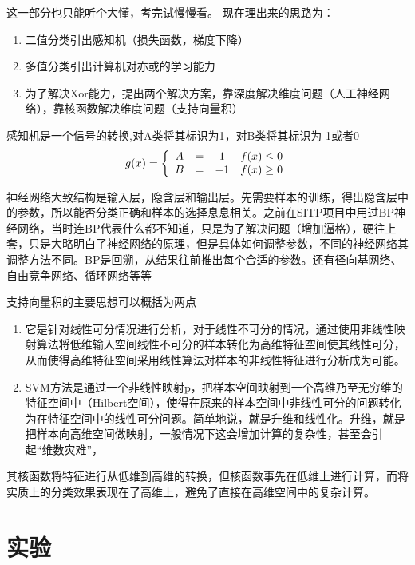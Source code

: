 \documentclass[a4paper,16pt,UTF8]{article}
\begin{document}
这一部分也只能听个大懂，考完试慢慢看。
现在理出来的思路为：

\begin{enumerate}
    \item 二值分类引出感知机（损失函数，梯度下降）
    \item 多值分类引出计算机对亦或的学习能力
    \item 为了解决Xor能力，提出两个解决方案，靠深度解决维度问题（人工神经网络），靠核函数解决维度问题（支持向量积）
\end{enumerate}

感知机是一个信号的转换,对A类将其标识为1，对B类将其标识为-1或者0
\begin{equation*}
    g(x) = \left \{ 
        \begin{array}{c c c c}
            A &=&1 & {f(x) \leq 0}\\
            B &=&-1 & {f(x) \geq 0}
        \end{array} 
        \right.
\end{equation*}

神经网络大致结构是输入层，隐含层和输出层。先需要样本的训练，得出隐含层中的参数，所以能否分类正确和样本的选择息息相关。之前在SITP项目中用过BP神经网络，当时连BP代表什么都不知道，只是为了解决问题（增加逼格），硬往上套，只是大略明白了神经网络的原理，但是具体如何调整参数，不同的神经网络其调整方法不同。BP是回溯，从结果往前推出每个合适的参数。还有径向基网络、自由竞争网络、循环网络等等

支持向量积的主要思想可以概括为两点
\begin{enumerate}
    \item 它是针对线性可分情况进行分析，对于线性不可分的情况，通过使用非线性映射算法将低维输入空间线性不可分的样本转化为高维特征空间使其线性可分，从而使得高维特征空间采用线性算法对样本的非线性特征进行分析成为可能。
    \item SVM方法是通过一个非线性映射p，把样本空间映射到一个高维乃至无穷维的特征空间中（Hilbert空间），使得在原来的样本空间中非线性可分的问题转化为在特征空间中的线性可分问题。简单地说，就是升维和线性化。升维，就是把样本向高维空间做映射，一般情况下这会增加计算的复杂性，甚至会引起“维数灾难”，
\end{enumerate}
其核函数将特征进行从低维到高维的转换，但核函数事先在低维上进行计算，而将实质上的分类效果表现在了高维上，避免了直接在高维空间中的复杂计算。

\section{实验}
\end{document}

